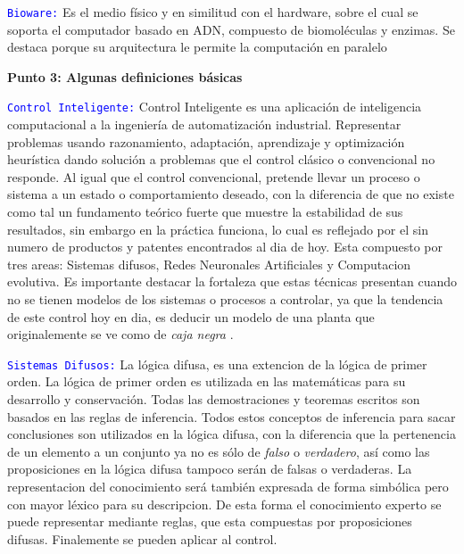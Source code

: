 \documentclass[10pt,onecolumn,twoside,letterpaper]{article}
\begin{document}
\textcolor{blue}{\texttt{Bioware:}} Es el medio f\'isico y en similitud con el hardware, sobre el cual se soporta el computador basado en ADN, compuesto de biomol\'eculas y enzimas. Se destaca porque su arquitectura le permite la computaci\'on en paralelo\\
\par{\bf \large Punto 3: Algunas definiciones b\'asicas}\\
\par \textcolor{blue}{\texttt{Control Inteligente:}}  Control Inteligente es una aplicaci\'on de inteligencia computacional a la ingenier\'ia de automatizaci\'on industrial. Representar problemas usando razonamiento, adaptaci\'on, aprendizaje y optimizaci\'on heurística dando soluci\'on a problemas que el control cl\'asico o convencional no responde. Al igual que el control convencional, pretende llevar un proceso o sistema a un estado o comportamiento deseado, con la diferencia de que no existe como tal un fundamento te\'orico fuerte que muestre la estabilidad de sus resultados, sin embargo en la pr\'actica funciona, lo cual es reflejado por el sin numero de productos y patentes encontrados al dia de hoy. Esta compuesto por tres areas: Sistemas difusos, Redes Neuronales Artificiales y Computacion evolutiva. Es importante destacar la fortaleza que estas t\'ecnicas presentan cuando no se tienen modelos de los sistemas o procesos a controlar, ya que la tendencia de este control hoy en dia, es deducir un modelo de una planta que originalemente se ve como de \emph{caja negra} \cite{Craenen,website:lifeworm}.
\par \textcolor{blue}{\texttt{Sistemas Difusos:}} La l\'ogica difusa, es una extencion de la l\'ogica de primer orden. La l\'ogica de primer orden es utilizada en las matem\'aticas para su desarrollo y conservaci\'on. Todas las demostraciones y teoremas escritos son basados en las reglas de inferencia. Todos estos conceptos de inferencia para sacar conclusiones son utilizados en la l\'ogica difusa, con la diferencia que la pertenencia de un elemento a un conjunto ya no es s\'olo de \emph{falso} o \emph{verdadero}, as\'i como las proposiciones en la l\'ogica difusa tampoco ser\'an de falsas o verdaderas. La representacion del conocimiento ser\'a tambi\'en expresada de forma simb\'olica pero con mayor l\'exico para su descripcion. De esta forma el conocimiento experto se puede representar mediante reglas, que esta compuestas por proposiciones difusas. Finalemente se pueden aplicar al control\cite{russell2004}.
\end{document}
